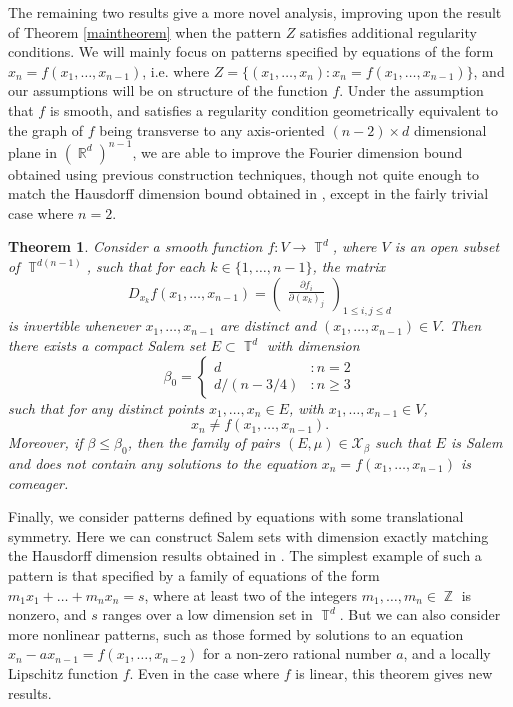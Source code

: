 \documentclass[dvipsnames,letterpaper,12pt]{article}
\numberwithin{equation}{section}
\DeclareMathOperator{\RR}{\mathbb{R}}
\DeclareMathOperator{\ZZ}{\mathbb{Z}}
\DeclareMathOperator{\TT}{\mathbb{T}}
\newtheorem{theorem}{Theorem}
\numberwithin{theorem}{section}
\begin{document}
The remaining two results give a more novel analysis, improving upon the result of Theorem \ref{maintheorem} when the pattern $Z$ satisfies additional regularity conditions. We will mainly focus on patterns specified by equations of the form $x_n = f(x_1,\dots,x_{n-1})$, i.e. where $Z = \{ (x_1,\dots,x_n): x_n = f(x_1,\dots,x_{n-1}) \}$, and our assumptions will be on structure of the function $f$. Under the assumption that $f$ is smooth, and satisfies a regularity condition geometrically equivalent to the graph of $f$ being transverse to any axis-oriented $(n-2) \times d$ dimensional plane in $(\RR^d)^{n-1}$, we are able to improve the Fourier dimension bound obtained using previous construction techniques, though not quite enough to match the Hausdorff dimension bound obtained in \cite{PramanikFraser}, except in the fairly trivial case where $n = 2$.

\begin{theorem} \label{theoremJOICVIOJVI122}
    Consider a smooth function $f: V \to \TT^d$, where $V$ is an open subset of $\TT^{d(n-1)}$, such that for each $k \in \{ 1, \dots, n-1 \}$, the matrix
    \[ D_{x_k} f(x_1,\dots,x_{n-1}) = \begin{pmatrix} \frac{\partial f_i}{\partial (x_k)_j} \end{pmatrix}_{1 \leq i,j \leq d} \]
    is invertible whenever $x_1,\dots,x_{n-1}$ are distinct and $(x_1,\dots,x_{n-1}) \in V$. Then there exists a compact Salem set $E \subset \TT^d$ with dimension
    \[ \beta_0 = \begin{cases} d &: n = 2 \\ d/(n - 3/4) &: n \geq 3 \end{cases} \]
    such that for any distinct points $x_1, \dots, x_n \in E$, with $x_1,\dots,x_{n-1} \in V$,
    \[ x_n \neq f(x_1,\dots,x_{n-1}). \]
    Moreover, if $\beta \leq \beta_0$, then the family of pairs $(E,\mu) \in \mathcal{X}_\beta$ such that $E$ is Salem and does not contain any solutions to the equation $x_n = f(x_1,\dots,x_{n-1})$ is comeager.
\end{theorem}

Finally, we consider patterns defined by equations with some translational symmetry. Here we can construct Salem sets with dimension exactly matching the Hausdorff dimension results obtained in \cite{OurPaper}. The simplest example of such a pattern is that specified by a family of equations of the form $m_1x_1 + \dots + m_nx_n = s$, where at least two of the integers $m_1,\dots,m_n \in \ZZ$ is nonzero, and $s$ ranges over a low dimension set in $\TT^d$. But we can also consider more nonlinear patterns, such as those formed by solutions to an equation $x_n - a x_{n-1} = f(x_1,\dots,x_{n-2})$ for a non-zero rational number $a$, and a locally Lipschitz function $f$. Even in the case where $f$ is linear, this theorem gives new results.
\end{document}
